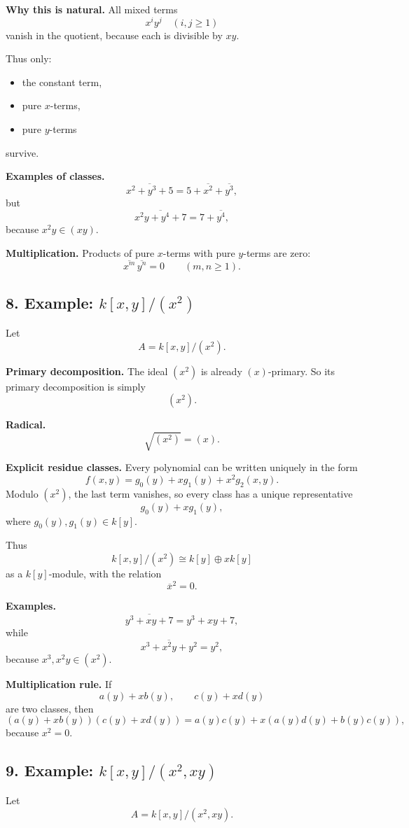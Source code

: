 \documentclass[12pt,a4paper]{article}
\theoremstyle{notespace}
\begin{document}
\textbf{Why this is natural.}
All mixed terms
\[
x^iy^j \quad (i,j\ge 1)
\]
vanish in the quotient, because each is divisible by \(xy\).

Thus only:
\begin{itemize}
	\item the constant term,
	\item pure \(x\)-terms,
	\item pure \(y\)-terms
\end{itemize}
survive.

\textbf{Examples of classes.}
\[
\overline{x^2+y^3+5} = 5+\overline{x^2}+\overline{y^3},
\]
but
\[
\overline{x^2y+y^4+7} = 7+\overline{y^4},
\]
because \(x^2y\in (xy)\).

\textbf{Multiplication.}
Products of pure \(x\)-terms with pure \(y\)-terms are zero:
\[
\overline{x^m}\,\overline{y^n}=0 \qquad (m,n\ge 1).
\]

\subsection{8. Example: \(k[x,y]/(x^2)\)}

Let
\[
A=k[x,y]/(x^2).
\]

\textbf{Primary decomposition.}
The ideal \((x^2)\) is already \((x)\)-primary.
So its primary decomposition is simply
\[
(x^2).
\]

\textbf{Radical.}
\[
\sqrt{(x^2)}=(x).
\]

\textbf{Explicit residue classes.}
Every polynomial can be written uniquely in the form
\[
f(x,y)=g_0(y)+xg_1(y)+x^2g_2(x,y).
\]
Modulo \((x^2)\), the last term vanishes, so every class has a unique representative
\[
g_0(y)+xg_1(y),
\]
where \(g_0(y),g_1(y)\in k[y]\).

Thus
\[
k[x,y]/(x^2)\cong k[y]\oplus xk[y]
\]
as a \(k[y]\)-module, with the relation
\[
\overline x^2=0.
\]

\textbf{Examples.}
\[
\overline{y^3+xy+7}=y^3+x y+7,
\]
while
\[
\overline{x^3+x^2y+y^2}=y^2,
\]
because \(x^3,x^2y\in (x^2)\).

\textbf{Multiplication rule.}
If
\[
a(y)+x b(y),\qquad c(y)+x d(y)
\]
are two classes, then
\[
(a(y)+x b(y))(c(y)+x d(y))
=
a(y)c(y)+x(a(y)d(y)+b(y)c(y)),
\]
because \(x^2=0\).

\subsection{9. Example: \(k[x,y]/(x^2,xy)\)}

Let
\[
A=k[x,y]/(x^2,xy).
\]
\end{document}
